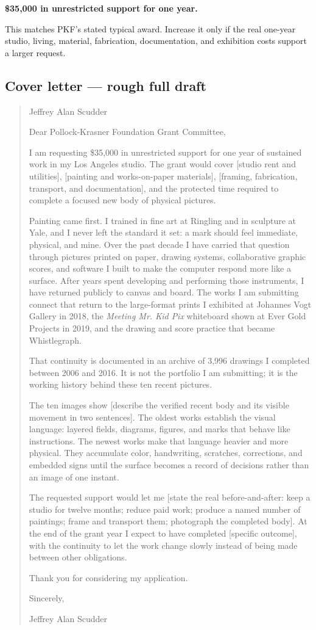 \documentclass[11pt,letterpaper]{article}
\begin{document}
\textbf{\$35,000 in unrestricted support for one year.}

This matches PKF's stated typical award. Increase it only if the real one-year studio, living, material, fabrication, documentation, and exhibition costs support a larger request.

\subsection{Cover letter --- rough full draft}

\begin{quote}
\small
Jeffrey Alan Scudder

Dear Pollock-Krasner Foundation Grant Committee,

I am requesting \$35,000 in unrestricted support for one year of sustained work in my Los Angeles studio. The grant would cover [studio rent and utilities], [painting and works-on-paper materials], [framing, fabrication, transport, and documentation], and the protected time required to complete a focused new body of physical pictures.

Painting came first. I trained in fine art at Ringling and in sculpture at Yale, and I never left the standard it set: a mark should feel immediate, physical, and mine. Over the past decade I have carried that question through pictures printed on paper, drawing systems, collaborative graphic scores, and software I built to make the computer respond more like a surface. After years spent developing and performing those instruments, I have returned publicly to canvas and board. The works I am submitting connect that return to the large-format prints I exhibited at Johannes Vogt Gallery in 2018, the \textit{Meeting Mr. Kid Pix} whiteboard shown at Ever Gold Projects in 2019, and the drawing and score practice that became Whistlegraph.

That continuity is documented in an archive of 3,996 drawings I completed between 2006 and 2016. It is not the portfolio I am submitting; it is the working history behind these ten recent pictures.

The ten images show [describe the verified recent body and its visible movement in two sentences]. The oldest works establish the visual language: layered fields, diagrams, figures, and marks that behave like instructions. The newest works make that language heavier and more physical. They accumulate color, handwriting, scratches, corrections, and embedded signs until the surface becomes a record of decisions rather than an image of one instant.

The requested support would let me [state the real before-and-after: keep a studio for twelve months; reduce paid work; produce a named number of paintings; frame and transport them; photograph the completed body]. At the end of the grant year I expect to have completed [specific outcome], with the continuity to let the work change slowly instead of being made between other obligations.

Thank you for considering my application.

Sincerely,

Jeffrey Alan Scudder
\end{quote}
\end{document}
